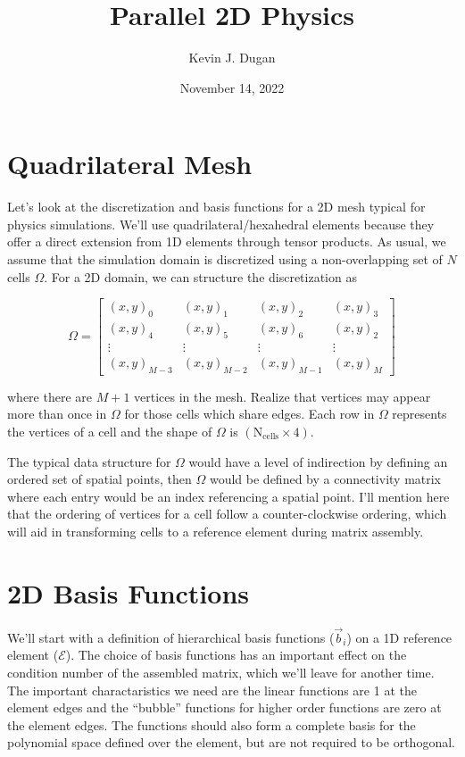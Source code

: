 \documentclass[11pt]{style/memo}
\title{Parallel 2D Physics}
\author{Kevin J. Dugan}
\date{November 14, 2022}
\begin{document}
\maketitle

\section{Quadrilateral Mesh}
Let's look at the discretization and basis functions for a 2D mesh
typical for physics simulations. We'll use quadrilateral/hexahedral
elements because they offer a direct extension from 1D elements through
tensor products. As usual, we assume that the simulation domain is
discretized using a non-overlapping set of $N$ cells $\Omega$. For a 2D
domain, we can structure the discretization as

\begin{equation*}
    \Omega = \begin{bmatrix}
        (x,y)_0 & (x,y)_1 & (x,y)_2 & (x,y)_3 \\
        (x,y)_4 & (x,y)_5 & (x,y)_6 & (x,y)_2 \\
        \vdots & \vdots & \vdots & \vdots \\
        (x,y)_{M-3} & (x,y)_{M-2} & (x,y)_{M-1} & (x,y)_M
    \end{bmatrix}
\end{equation*}

where there are $M+1$ vertices in the mesh. Realize that vertices may appear
more than once in $\Omega$ for those cells which share edges. Each row in
$\Omega$ represents the vertices of a cell and the shape of $\Omega$ is
$(\mathrm{N}_\mathrm{cells} \times 4)$. 

The typical data structure for $\Omega$ would have a level of indirection
by defining an ordered set of spatial points, then $\Omega$ would be defined
by a connectivity matrix where each entry would be an index referencing a
spatial point. I'll mention here that the ordering of vertices for a cell
follow a counter-clockwise ordering, which will aid in transforming cells
to a reference element during matrix assembly.

\section{2D Basis Functions}
We'll start with a definition of hierarchical basis functions ($\vec{b}_i$) on a
1D reference element ($\mathcal{E}$). The choice of basis functions has an
important effect on the condition number of the assembled matrix, which we'll
leave for another time. The important charactaristics we need are the linear
functions are 1 at the element edges and the ``bubble'' functions for higher
order functions are zero at the element edges. The functions should also
form a complete basis for the polynomial space defined over the element,
but are not required to be orthogonal.
\end{document}
